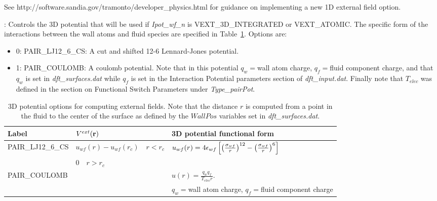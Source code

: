 \documentclass[10pt,onecolumn]{article}
\begin{document}
\noindent   
See http://software.sandia.gov/tramonto/developer\_physics.html for guidance on
implementing a new 1D external field option.

\noindent\dotfill

\vspace{0.1in}
\vspace{0.1in}
:  
Controls the 3D potential that will be used if {\it Ipot\_wf\_n} is VEXT\_3D\_INTEGRATED or VEXT\_ATOMIC.  The specific form of the interactions between the wall atoms and fluid species are specified in Table~\ref{tab:vexttable3}. Options are:
\begin{itemize}
\item{0: PAIR\_LJ12\_6\_CS: A cut and shifted 12-6 Lennard-Jones potential.}
\item{1: PAIR\_COULOMB: A coulomb potential.  Note that in this potential $q_w=$wall atom charge, $q_f=$fluid component charge, and that  
$q_w$ is set in {\it dft\_surfaces.dat} while 
$q_f$ is set in the Interaction Potential 
parameters section of {\it dft\_input.dat}.  Finally note that $T_{elec}$ was defined in the section on Functional
Switch Parameters under {\it Type\_pairPot}.}
\end{itemize}
%
\begin{table}[h]
\center\begin{tabular}{|l|l|l|} \hline
Label & $V^{ext}({\bf r})$ & 3D potential functional form \\ \hline 
PAIR\_LJ12\_6\_CS & $u_{wf}(r)-u_{wf}(r_{c}) \quad r < r_{c}$ & 
$u_{wf}(r)=4\epsilon_{wf}\left[\left({\sigma_{wf}\over r}\right)^{12}-
        \left({\sigma_{wf}\over r}\right)^{6}\right]$\\ 
& $0  \quad r > r_{c}$ & \\ \hline 
PAIR\_COULOMB & &  $u(r) = \frac{q_w q_f}{T_{elec} r}$.\\ 
&& $q_w=$wall atom charge, $q_f=$fluid component charge \\ \hline
\end{tabular}
\caption{3D potential options for computing external fields.  Note that the 
distance $r$ is computed from a point in the fluid to the center of the surface
as defined by the $WallPos$ variables set in {\it dft\_surfaces.dat}.  }
\label{tab:vexttable3}
\end{table}

\noindent\dotfill
\end{document}
